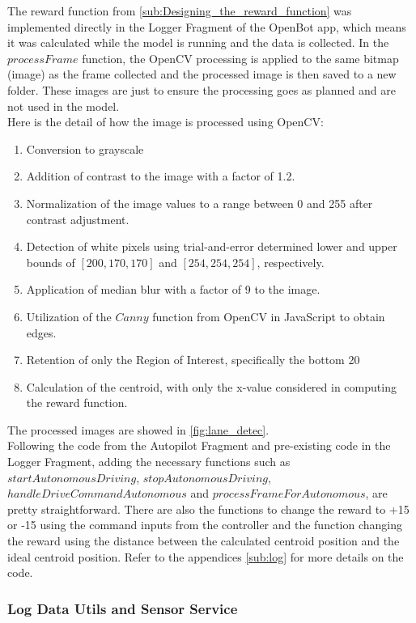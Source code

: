 \documentclass[12pt]{report}
\begin{document}
The reward function from \ref{sub:Designing_the_reward_function} was implemented directly in the Logger Fragment of the OpenBot app, which means it was calculated while the model is running and the data is collected. In the $processFrame$ function, the OpenCV processing is applied to the same bitmap (image) as the frame collected and the processed image is then saved to a new folder. These images are just to ensure the processing goes as planned and are not used in the model. 
\\[3mm]
Here is the detail of how the image is processed using OpenCV:
\begin{enumerate}
    \item Conversion to grayscale
    \item Addition of contrast to the image with a factor of 1.2.
    \item Normalization of the image values to a range between 0 and 255 after contrast adjustment.
    \item Detection of white pixels using trial-and-error determined lower and upper bounds of $[200,170,170]$ and $[254,254,254]$, respectively.
    \item Application of median blur with a factor of 9 to the image.
    \item Utilization of the $Canny$ function from OpenCV in JavaScript to obtain edges.
    \item Retention of only the Region of Interest, specifically the bottom 20%
    \item Calculation of the centroid, with only the x-value considered in computing the reward function.
\end{enumerate}


\noindent The processed images are showed in \ref{fig:lane_detec}. 
\\[3mm]
Following the code from the Autopilot Fragment and pre-existing code in the Logger Fragment, adding the necessary functions such as $startAutonomousDriving$, $stopAutonomousDriving$, $handleDriveCommandAutonomous$ and $processFrameForAutonomous$,  are pretty straightforward. There are also the functions to change the reward to +15 or -15 using the command inputs from the controller and the function changing the reward using the distance between the calculated centroid position and the ideal centroid position. Refer to the appendices \ref{sub:log} for more details on the code.


\subsubsection{Log Data Utils and Sensor Service}
\end{document}
